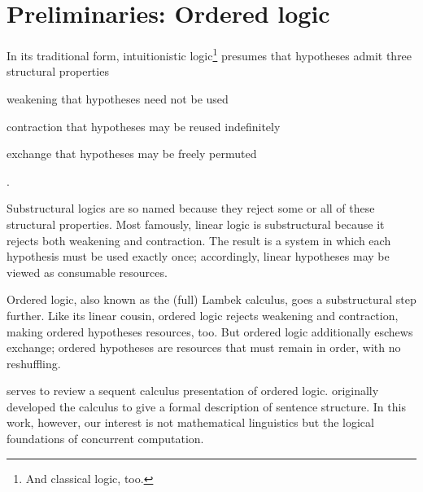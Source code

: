 \chapter{Preliminaries: Ordered logic}\label{ch:ordered-logic}




In its traditional form, intuitionistic logic\footnote{And classical logic, too.} presumes that hypotheses admit three structural properties
\begin{description*}[
  mode=unboxed,
  before=\unskip:\space,
  font=\normalfont, afterlabel={,\space},
  itemjoin=;\space, itemjoin*=; and\space%
]
\item[weakening] that hypotheses need not be used
\item[contraction] that hypotheses may be reused indefinitely
\item[exchange] that hypotheses may be freely permuted
\end{description*}.

Substructural logics are so named because they reject some or all of these structural properties.
Most famously, linear logic\autocite{Girard:TCS87} is substructural because it rejects both weakening and contraction.
The result is a system in which each hypothesis must be used exactly once; accordingly, linear hypotheses may be viewed as consumable resources\autocite{Girard:TCS87}.

Ordered logic, also known as the (full) Lambek calculus,\autocite{Lambek:AMM58} goes a substructural step further.
Like its linear cousin, ordered logic rejects weakening and contraction, making ordered hypotheses resources, too.
But ordered logic additionally eschews exchange; 
ordered hypotheses are resources that must remain in order, with no reshuffling.


serves to review a sequent calculus presentation of ordered logic.
 originally developed the calculus to give a formal description of sentence structure.
In this work, however, our interest is not mathematical linguistics but the logical foundations of concurrent computation.




